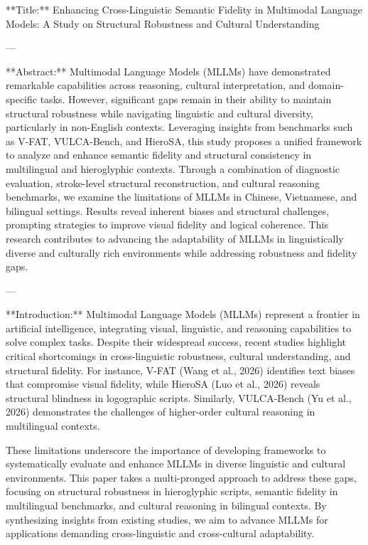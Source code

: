 **Title:** Enhancing Cross-Linguistic Semantic Fidelity in Multimodal Language Models: A Study on Structural Robustness and Cultural Understanding  

---

**Abstract:**  
Multimodal Language Models (MLLMs) have demonstrated remarkable capabilities across reasoning, cultural interpretation, and domain-specific tasks. However, significant gaps remain in their ability to maintain structural robustness while navigating linguistic and cultural diversity, particularly in non-English contexts. Leveraging insights from benchmarks such as V-FAT, VULCA-Bench, and HieroSA, this study proposes a unified framework to analyze and enhance semantic fidelity and structural consistency in multilingual and hieroglyphic contexts. Through a combination of diagnostic evaluation, stroke-level structural reconstruction, and cultural reasoning benchmarks, we examine the limitations of MLLMs in Chinese, Vietnamese, and bilingual settings. Results reveal inherent biases and structural challenges, prompting strategies to improve visual fidelity and logical coherence. This research contributes to advancing the adaptability of MLLMs in linguistically diverse and culturally rich environments while addressing robustness and fidelity gaps.

---

**Introduction:**  
Multimodal Language Models (MLLMs) represent a frontier in artificial intelligence, integrating visual, linguistic, and reasoning capabilities to solve complex tasks. Despite their widespread success, recent studies highlight critical shortcomings in cross-linguistic robustness, cultural understanding, and structural fidelity. For instance, V-FAT (Wang et al., 2026) identifies text biases that compromise visual fidelity, while HieroSA (Luo et al., 2026) reveals structural blindness in logographic scripts. Similarly, VULCA-Bench (Yu et al., 2026) demonstrates the challenges of higher-order cultural reasoning in multilingual contexts.

These limitations underscore the importance of developing frameworks to systematically evaluate and enhance MLLMs in diverse linguistic and cultural environments. This paper takes a multi-pronged approach to address these gaps, focusing on structural robustness in hieroglyphic scripts, semantic fidelity in multilingual benchmarks, and cultural reasoning in bilingual contexts. By synthesizing insights from existing studies, we aim to advance MLLMs for applications demanding cross-linguistic and cross-cultural adaptability.

